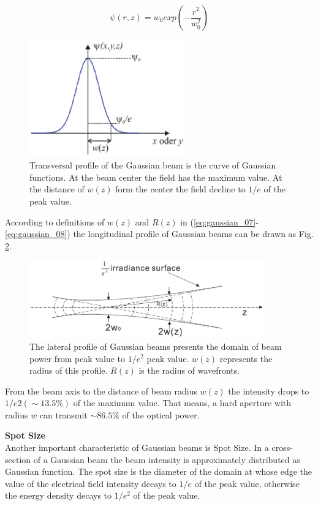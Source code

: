 \begin{equation}
\psi(r,z)=w_{0}exp\left(-\frac{r^2}{w^2_{0}}\right)
\label{eq:gaussian_09}
\end{equation}
\begin{figure}[!ht]
\centering
\includegraphics[width=0.6\textwidth]{bilder/gussian_verteilung}
\caption{Transversal profile of the Gaussian beam is the curve of Gaussian functions. At the beam center the field has the maximum value. At the distance of $w(z)$ form the center the field decline to $1/e$ of the peak value.}
\label{fig:gaussian_verteilung}
\end{figure}
According to definitions of $w(z)$ and $R(z)$ in (\ref{eq:gaussian_07}-\ref{eq:gaussian_08}) the longitudinal profile of Gaussian beams can be drawn as Fig. \ref{fig:gussian_profile}.
\begin{figure}[!ht]
\centering
\includegraphics[width=0.9\textwidth]{bilder/gussian_profile}
\caption{The lateral profile of Gaussian beams presents the domain of beam power from peak value to $1/e^2$ peak value. $w(z)$ represents the radius of this profile. $R(z)$ is the radius of wavefronts.}
\label{fig:gussian_profile}
\end{figure}
From the beam axis to the distance of beam radius $w(z)$ the intensity drops to $1/e2 (\sim13.5\%)$ of the maximum value. That means, a hard aperture with radius $w$ can transmit $\sim86.5\%$ of the optical power.

\textbf{Spot Size}\\
Another important characteristic of Gaussian beams is Spot Size. In a cross-section of a Gaussian beam the beam intensity is approximately distributed as Gaussian function. The spot size is the diameter of the domain at whose edge the value of the electrical field intensity decays to $1/e$ of the peak value, otherwise the energy density decays to $1/e^2$ of the peak value.
